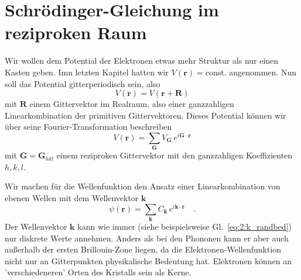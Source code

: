  



\section*{Schrödinger-Gleichung im reziproken Raum}

Wir wollen  dem Potential der Elektronen etwas mehr Struktur als nur einen Kasten geben. Imn letzten Kapitel hatten wir $V(\mathbf{r}) = \text{const.}$ angenommen. Nun soll das Potential gitterperiodisch sein, also
\begin{equation}
    V(\mathbf{r}) = V(\mathbf{r} + \mathbf{R})
\end{equation} 
mit $\mathbf{R}$ einem Gittervektor im Realraum, also einer ganzzahligen Linearkombination der primitiven Gittervektoren. Dieses Potential können wir  über seine Fourier-Transformation beschreiben
\begin{equation}
    V(\mathbf{r}) = \sum_{\mathbf{G}} V_{\mathbf{G}} \, e^{i \mathbf{G} \cdot \mathbf{r} }
\end{equation} 
mit $\mathbf{G} = \mathbf{G}_{hkl}$ einem reziproken Gittervektor mit den ganzzahligen Koeffizienten $h,k,l$.


Wir machen  für die Wellenfunktion den Ansatz einer Linearkombination von ebenen Wellen mit dem Wellenvektor $\mathbf{k}$
\begin{equation}
    \psi(\mathbf{r}) = \sum_{\mathbf{k}} C_{\mathbf{k}} \, e^{i \mathbf{k} \cdot \mathbf{r} } \quad . \label{eq:2_psi_allg}
\end{equation}
Der Wellenvektor  $\mathbf{k}$ kann wie immer (siehe beispielsweise  Gl.~\ref{eq:2:k_randbed}) nur diskrete Werte annehmen. Anders als bei den Phononen kann er aber auch außerhalb der ersten Brillouin-Zone liegen, da die Elektronen-Wellenfunktion  nicht nur an Gitterpunkten physikalische Bedeutung hat. Elektronen können an 'verschiedeneren' Orten des Kristalls sein als Kerne.

